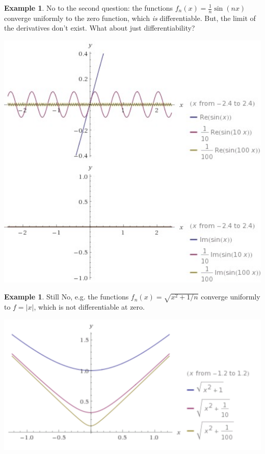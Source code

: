 \documentclass[12pt]{article}
\theoremstyle{plain}
\theoremstyle{definition}
\newtheorem{example}[theorem]{Example}
\theoremstyle{remark}
\begin{document}
\begin{example}
No to the second question: the functions $f_n(x) = \frac{1}{n} \sin(nx)$ converge uniformly to the zero function, which \textit{is} differentiable. But, the limit of the derivatives don't exist. What about just differentiability? 
\end{example}

\centerline{\includegraphics[width=1.0\textwidth]{uniformconvergence1}}

\begin{example}
Still No, e.g. the functions $f_n(x) = \sqrt{x^2 + 1/n}$ converge uniformly to $f = |x|$, which is not differentiable at zero.
\end{example}

\centerline{\includegraphics[width=1.0\textwidth]{uniformconvergence2}}
\end{document}
